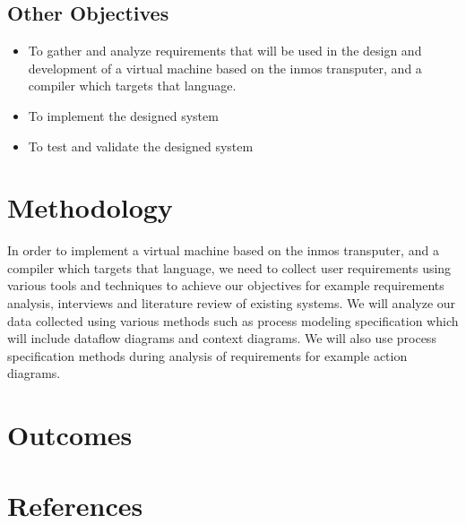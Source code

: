 \documentclass[dvips,12pt]{article}
\begin{document}
	\subsection{Other Objectives}
	
	\begin{itemize}
		\item To gather and analyze requirements that will be used in the design and development of a virtual machine based on the inmos transputer, and a compiler which targets that language.
		\item To implement the designed system
		\item To test and validate the designed system 
	\end{itemize}
	
	\section{Methodology}
	In order to  implement a virtual machine based on the inmos transputer, and a compiler which targets that language, we need to collect user requirements using various tools and techniques to achieve our objectives for example requirements analysis, interviews and literature review of existing systems.
	We will analyze our data collected using various methods such as process modeling specification which will include dataflow diagrams and context diagrams. We will also use process specification methods during analysis of requirements for example action diagrams. 
	\section{Outcomes}
	
	\section{References}
	
	
\end{document}
